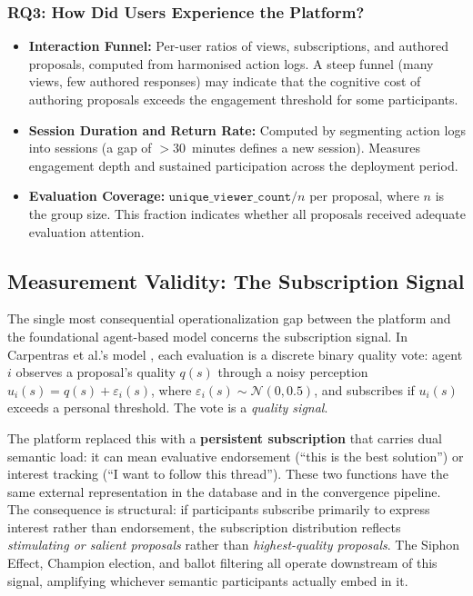 \documentclass[a4paper, 12pt, twoside]{iviathesis}
\begin{document}
\subsubsection{RQ3: How Did Users Experience the Platform?}
\begin{itemize}
    \item \textbf{Interaction Funnel:} Per-user ratios of views, subscriptions, and authored proposals, computed from harmonised action logs. A steep funnel (many views, few authored responses) may indicate that the cognitive cost of authoring proposals exceeds the engagement threshold for some participants.
    \item \textbf{Session Duration and Return Rate:} Computed by segmenting action logs into sessions (a gap of $>$30~minutes defines a new session). Measures engagement depth and sustained participation across the deployment period.
    \item \textbf{Evaluation Coverage:} $\texttt{unique\_viewer\_count} / n$ per proposal, where $n$ is the group size. This fraction indicates whether all proposals received adequate evaluation attention.
\end{itemize}

\subsection{Measurement Validity: The Subscription Signal}
\label{sec:subscription-validity}

The single most consequential operationalization gap between the platform and the foundational agent-based model concerns the subscription signal. In Carpentras et al.'s model \cite{carpentras_wisdom_2025}, each evaluation is a discrete binary quality vote: agent $i$ observes a proposal's quality $q(s)$ through a noisy perception $u_i(s) = q(s) + \varepsilon_i(s)$, where $\varepsilon_i(s) \sim \mathcal{N}(0, 0.5)$, and subscribes if $u_i(s)$ exceeds a personal threshold. The vote is a \textit{quality signal}.

The platform replaced this with a \textbf{persistent subscription} that carries dual semantic load: it can mean evaluative endorsement (``this is the best solution'') or interest tracking (``I want to follow this thread''). These two functions have the same external representation in the database and in the convergence pipeline. The consequence is structural: if participants subscribe primarily to express interest rather than endorsement, the subscription distribution reflects \textit{stimulating or salient proposals} rather than \textit{highest-quality proposals}. The Siphon Effect, Champion election, and ballot filtering all operate downstream of this signal, amplifying whichever semantic participants actually embed in it.
\end{document}
